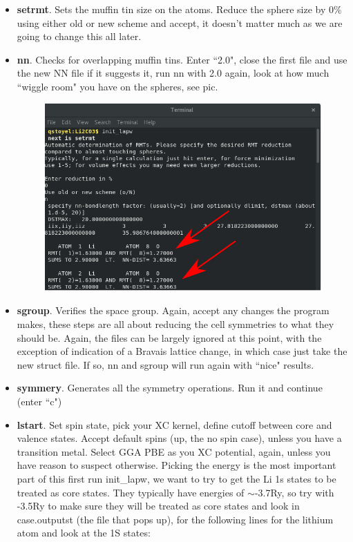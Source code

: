 \documentclass[12pt]{article}
\begin{document}
\begin{itemize}
	\item \textbf{setrmt}. Sets the muffin tin size on the atoms.  Reduce the sphere size by 0\% using either old or new scheme and accept, it doesn't matter much as we are going to change this all later.
	\item  \textbf{nn}.  Checks for overlapping muffin tins. Enter ``2.0", close the first file and use the new NN file if it suggests it, run nn with 2.0 again, look at how much ``wiggle room" you have on the spheres, see pic. 
	
	\begin{figure}[H]
		\includegraphics[scale=0.4]{./images/init_lapw2.png}
	\end{figure}
	
	\item \textbf{sgroup}. Verifies the space group.  Again, accept any changes the program makes, these steps are all about reducing the cell symmetries to what they should be. Again, the files can be largely  ignored at this point, with the exception of indication of a Bravais lattice change, in which case just take the new struct file. If so, nn and sgroup will run again with ``nice" results.  
	\item  \textbf{symmery}. Generates all the symmetry operations. Run it and continue (enter ``c")
	\item  \textbf{lstart}. Set spin state, pick your XC kernel, define cutoff between core and valence states.  Accept default spins (up, the no spin case), unless you have a transition metal. Select GGA PBE as you XC potential, again, unless you have reason to suspect otherwise. Picking the energy is the most important part of this first run init\_lapw, we want to try to get the Li 1s states to be treated as core states.  They typically have energies of $\sim$-3.7Ry, so try with -3.5Ry to make sure they will be treated as core states and look in case.outputst (the file that pops up), for the following lines for the lithium atom and look at the 1S states:  
	

\end{itemize}
\end{document}
